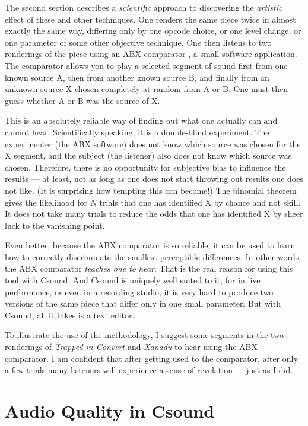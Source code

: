 \documentclass[english,11pt,letterpaper,onecolumn]{scrartcl}
\begin{document}
The second section describes a \emph{scientific} approach to discovering the 
\emph{artistic} effect of these and other techniques. One renders the same 
piece twice in almost exactly the same way, differing only by one opcode 
choice, or one level change, or one parameter of some other objective 
technique. One then listens to two renderings of the piece using an ABX 
comparator \cite{winabx}, a small software application. The comparator allows 
you to play a selected segment of sound first from one known source A, then 
from another known source B, and finally from an unknown source X chosen 
completely at random from A or B. One must then guess whether A or B was the 
source of X.

This is an absolutely reliable way of finding out what one actually can and 
cannot hear. Scientifically speaking, it is a double-blind experiment. The 
experimenter (the ABX software) does not know which source was chosen for the 
X segment, and the subject (the listener) also does not know which source was 
chosen. Therefore, there is no opportunity for subjective bias to influence 
the results --- at least, not as long as one does not start throwing out 
results one does not like. (It is surprising how tempting this can become!) 
The binomial theorem gives the likelihood for $N$ trials that one has 
identified X by chance and not skill. It does not take many trials to reduce 
the odds that one has identified X by sheer luck to the vanishing point. 

Even better, because the ABX comparator is so reliable, it can be used to 
learn how to correctly discriminate the smallest perceptible differences. In 
other words, the ABX comparator \emph{teaches one to hear}. That is the real 
reason for using this tool with Csound. And Csound is uniquely well suited to 
it, for in live performance, or even in a recording studio, it is very hard to 
produce two versions of the same piece that differ only in one small parameter. 
But with Csound, all it takes is a text editor.

To illustrate the use of the methodology, I suggest some segments in the two 
renderings of \emph{Trapped in Convert} and \emph{Xanadu} to hear using the 
ABX comparator. I am confident that after getting used to the comparator, 
after only a few trials many listeners will experience a sense of revelation 
--- just as I did.

\section{Audio Quality in Csound}
\label{sec:Audio_Quality_in_Csound}
\end{document}
